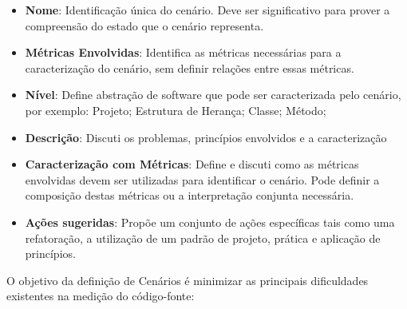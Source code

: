 \begin{itemize}
\item \textbf{Nome}: Identificação única do cenário. Deve ser significativo para prover a compreensão do estado que o cenário representa.
\item \textbf{Métricas Envolvidas}: Identifica as métricas necessárias para a caracterização do cenário, sem definir relações entre essas métricas.
\item \textbf{Nível}: Define abstração de software que pode ser caracterizada pelo cenário, por exemplo: Projeto; Estrutura de Herança; Classe; Método;
\item \textbf{Descrição}: Discuti os problemas, princípios envolvidos e a caracterização
\item \textbf{Caracterização com Métricas}: Define e discuti como as métricas envolvidas devem ser utilizadas para identificar o cenário. Pode definir a composição destas métricas ou a interpretação conjunta necessária.
\item \textbf{Ações sugeridas}: Propõe um conjunto de ações específicas tais como uma refatoração, a utilização de um padrão de projeto, prática e aplicação de princípios.
\end{itemize}

%

O objetivo da definição de Cenários é minimizar as principais dificuldades existentes na medição do código-fonte:

%


